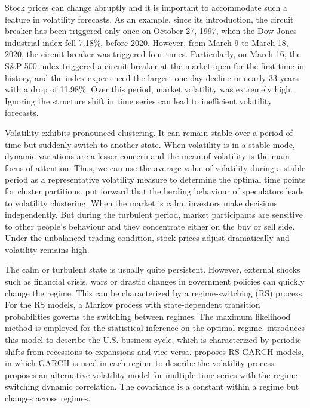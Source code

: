 \documentclass[preprint,12pt,authoryear]{elsarticle}
\begin{document}
Stock prices can change abruptly and it is important to accommodate such a feature in volatility forecasts. As an example, since its introduction, the circuit breaker has been triggered only once on October 27, 1997, when the Dow Jones industrial index fell 7.18\%, before 2020. However, from March 9 to March 18, 2020, the circuit breaker was triggered four times. Particularly, on March 16, the S\&P 500 index triggered a circuit breaker at the market open for the first time in history, and the index experienced the largest one-day decline in nearly 33 years with a drop of 11.98\%. Over this period, market volatility was extremely high. Ignoring the structure shift in time series can lead to inefficient volatility forecasts.

Volatility exhibits pronounced clustering. It can remain stable over a period of time but
suddenly switch to another state.
When volatility is in a stable mode, dynamic variations are a lesser concern and the mean of volatility is the main focus of attention.
Thus, we can use the average value of volatility during a stable
	period as a representative volatility measure to determine the optimal time points for cluster partitions.
\cite{Schmitt2017} put forward that the herding behaviour of speculators
	leads to volatility clustering. When the market is calm, investors make decisions
	independently. But during the turbulent period, market participants are sensitive to other people's behaviour and they concentrate either on the buy or sell side. Under the unbalanced trading condition, stock prices adjust dramatically and volatility remains high.
	
	The calm or turbulent state is usually quite persistent. However, external shocks	such as financial crisis, wars 
	or drastic changes in government policies can quickly change the regime.
	This can be characterized by a regime-switching (RS) process.  For the RS models, a Markov process with
	state-dependent transition probabilities governs the switching between regimes. The maximum
	likelihood method is employed for the statistical inference on the optimal regime.
	\cite{Hamilton1989} introduces this model to describe the U.S. business cycle, which is characterized
	by periodic shifts from recessions to expansions and vice versa. \cite{Klaassen2002} proposes
	RS-GARCH models, in which GARCH is used in each regime to describe the volatility process.
	\cite{Pelletier2006} proposes an alternative volatility model for multiple time series with the regime switching
	dynamic correlation. The covariance is a constant within a regime but changes across regimes.
	
\end{document}
